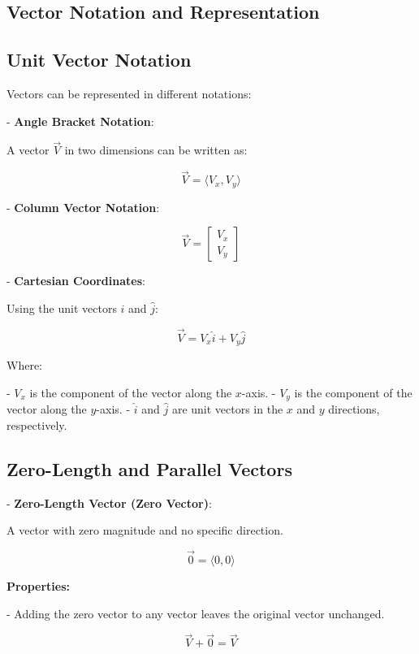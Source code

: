 \documentclass{article}
\begin{document}
\begin{multicols}{2}

\section*{Vector Notation and Representation}

\subsection*{Unit Vector Notation}

Vectors can be represented in different notations:

- \textbf{Angle Bracket Notation}:

  A vector $\vec{V}$ in two dimensions can be written as:

  
  \[
  \vec{V} = \langle V_x, V_y \rangle
  \]

- \textbf{Column Vector Notation}:

  \[
  \vec{V} = \begin{bmatrix} V_x \\ V_y \end{bmatrix}
  \]

- \textbf{Cartesian Coordinates}:

  Using the unit vectors $\hat{i}$ and $\hat{j}$:

  \[
  \vec{V} = V_x \hat{i} + V_y \hat{j}
  \]

Where:

- $ V_x $ is the component of the vector along the $ x $-axis.
- $ V_y $ is the component of the vector along the $ y $-axis.
- $ \hat{i} $ and $ \hat{j} $ are unit vectors in the $ x $ and $ y $ directions, respectively.

\subsection*{Zero-Length and Parallel Vectors}

- \textbf{Zero-Length Vector (Zero Vector)}:

  A vector with zero magnitude and no specific direction.

  \[
  \vec{0} = \langle 0, 0 \rangle
  \]

  \textbf{Properties:}

  - Adding the zero vector to any vector leaves the original vector unchanged.

    \[
    \vec{V} + \vec{0} = \vec{V}
    \]


\end{multicols}
\end{document}
